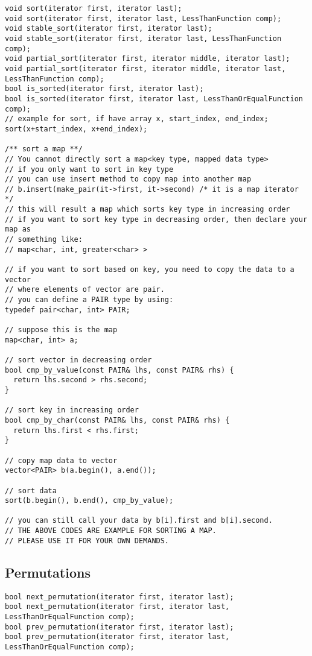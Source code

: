 \documentclass[a4paper]{article}
\begin{document}
\begin{verbatim}
void sort(iterator first, iterator last);
void sort(iterator first, iterator last, LessThanFunction comp);
void stable_sort(iterator first, iterator last);
void stable_sort(iterator first, iterator last, LessThanFunction comp);
void partial_sort(iterator first, iterator middle, iterator last);
void partial_sort(iterator first, iterator middle, iterator last, LessThanFunction comp);
bool is_sorted(iterator first, iterator last);
bool is_sorted(iterator first, iterator last, LessThanOrEqualFunction comp);
// example for sort, if have array x, start_index, end_index;
sort(x+start_index, x+end_index);

/** sort a map **/
// You cannot directly sort a map<key type, mapped data type>
// if you only want to sort in key type
// you can use insert method to copy map into another map
// b.insert(make_pair(it->first, it->second) /* it is a map iterator */
// this will result a map which sorts key type in increasing order
// if you want to sort key type in decreasing order, then declare your map as
// something like:
// map<char, int, greater<char> >

// if you want to sort based on key, you need to copy the data to a vector
// where elements of vector are pair.
// you can define a PAIR type by using:
typedef pair<char, int> PAIR;

// suppose this is the map
map<char, int> a;

// sort vector in decreasing order
bool cmp_by_value(const PAIR& lhs, const PAIR& rhs) {
  return lhs.second > rhs.second;
}

// sort key in increasing order
bool cmp_by_char(const PAIR& lhs, const PAIR& rhs) {
  return lhs.first < rhs.first;
}

// copy map data to vector
vector<PAIR> b(a.begin(), a.end());

// sort data
sort(b.begin(), b.end(), cmp_by_value);

// you can still call your data by b[i].first and b[i].second.
// THE ABOVE CODES ARE EXAMPLE FOR SORTING A MAP.
// PLEASE USE IT FOR YOUR OWN DEMANDS.
\end{verbatim}

\subsection{Permutations}
\begin{verbatim}
bool next_permutation(iterator first, iterator last);
bool next_permutation(iterator first, iterator last, LessThanOrEqualFunction comp);
bool prev_permutation(iterator first, iterator last);
bool prev_permutation(iterator first, iterator last, LessThanOrEqualFunction comp);
\end{verbatim}
\end{document}
